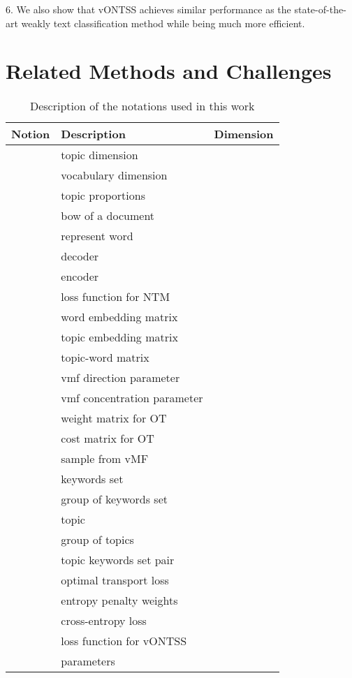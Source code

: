 \documentclass[11pt]{article}
\begin{document}
6. We also show that vONTSS achieves similar performance as the state-of-the-art weakly text classification method while being much more efficient.








\section{Related Methods and Challenges}
 
 

\begin{table}[t]
\caption{Description of the notations used in this work}
\label{sample-table}

\vskip 0.15in

\begin{center}
\begin{small}
\scalebox{0.85} {
\begin{tabular}{lll}
\toprule
Notion & Description & Dimension\\
\hline
\midrule
 & topic dimension  & \\
 & vocabulary dimension  & \\
 & topic proportions  & \\
 & bow of a document  & \\
 & represent word &  \\
 & decoder  & \\
 & encoder  & \\
 & loss function for NTM & \\
 & word embedding matrix & \\
 & topic embedding matrix & \\
 &  topic-word matrix & \\
 & vmf direction parameter   & \\
 &vmf concentration parameter  & \\
 & weight matrix for OT  & \\
 & cost matrix for OT  & \\
 & sample from vMF & \\
 & keywords set & \\
 & group of keywords set & \\
 & topic & \\
 & group of topics & \\
 & topic keywords set pair & \\
 & optimal transport loss & \\
 & entropy penalty weights & \\
 & cross-entropy loss & \\
 & loss function for vONTSS & \\
 & parameters  & \\
\hline
\end{tabular}}
\end{small}
\end{center}
\vskip -0.1in
\end{table}
\end{document}
